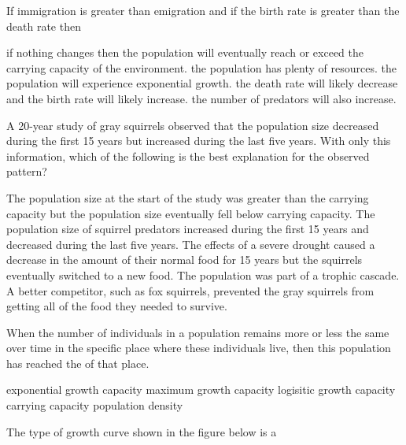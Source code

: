 \question
If immigration is greater than emigration and if the birth rate is greater than the death rate then

\begin{choices}
\correctchoice if nothing changes then the population will eventually reach or exceed the carrying capacity of the environment.%
\choice the population has plenty of resources.%
\choice the population will experience exponential growth.%
\choice the death rate will likely decrease and the birth rate will likely increase.%
\choice the number of predators will also increase.%
\end{choices}

\question
A 20-year study of gray squirrels observed that the population size decreased during the first 15 years but increased during the last five years. With only this information, which of the following is the best explanation for the observed pattern?

\begin{choices}
\correctchoice The population size at the start of the study was greater than the carrying capacity but the population size eventually fell below carrying capacity. %
\choice The population size of squirrel predators increased during the first 15 years and decreased during the last five years. %
\choice The effects of a severe drought caused a decrease in the amount of their normal food for 15 years but the squirrels eventually switched to a new food. %
\choice The population was part of a trophic cascade. %
\choice A better competitor, such as fox squirrels, prevented the gray squirrels from getting all of the food they needed to survive.%
\end{choices}


\question
When the number of individuals in a population remains more or less the same over time in the specific place where these individuals live, then this population has reached the \underline{\hspace{2cm}} of that place.

\begin{choices}
\choice exponential growth capacity%
\choice maximum growth capacity%
\choice logisitic growth capacity%
\correctchoice carrying capacity%
\choice population density%
\end{choices}

\question
The type of growth curve shown in the figure below is a

